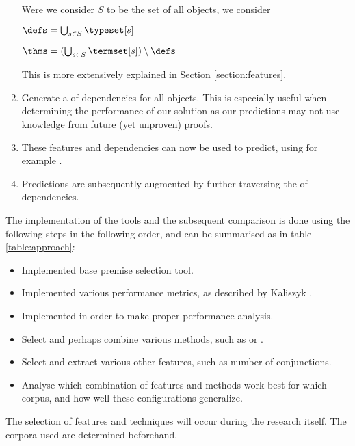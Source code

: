 \begin{enumerate}
		Were we consider $S$ to be the set of all \coq objects, we consider
		\begin{definition}
			$\defs = \bigcup_{s \in S} \typeset[s]$
		\end{definition}
		\begin{definition}
			$\thms = (\bigcup_{s \in S} \termset[s]) \setminus \defs$
		\end{definition}
		This is more extensively explained in Section \ref{section:features}.
    \item Generate a \dagraph of dependencies for all \coq objects.
		This is especially useful when determining the performance of our solution as our predictions may not use
		knowledge from future (yet unproven) proofs.
	\item These features and dependencies can now be used to predict, using for example \knn.
	\item Predictions are subsequently augmented by further traversing the \dagraph of dependencies.
\end{enumerate}

The implementation of the tools and the subsequent comparison is done using the following steps in the following order, and can be summarised as in table \ref{table:approach}:
\begin{itemize}
	\item Implemented base premise selection tool.
	\item Implemented various performance metrics, as described by Kaliszyk \cite{kaliszyk2014machine}.
	\item Implemented \crossvalidation in order to make proper performance analysis.
    \item Select and perhaps combine various \machinelearning methods, such as \nb or \ensemble.
	\item Select and extract various other features, such as number of conjunctions.
    \item Analyse which combination of features and \machinelearning methods work best for which corpus, and how well these configurations generalize.
\end{itemize}

The selection of features and \machinelearning techniques will occur during the research itself.
The corpora used are determined beforehand.

